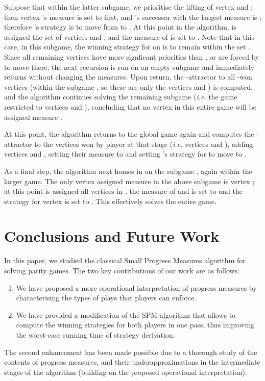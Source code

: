 \documentclass{eptcs}
\newcommand{\ie}{\emph{i.e.}\xspace}
\begin{document}
Suppose that within the latter subgame, we prioritise the lifting of
vertex  and ; then vertex 's measure is set to 
first, and 's successor with the largest measure is ;
therefore 's strategy is to move from  to . At this
point in the algorithm,  is assigned the set of vertices 
and , and the measure of  is set to . Note that in this
case, in this subgame, the winning strategy for  on  is to remain within
the set . Since all
remaining vertices have more signficant priorities than , or
are forced by  to move there, the next recursion is run on
an empty subgame and immediately returns without changing the
measures. Upon return, the -attractor to all -won
vertices (within the subgame , so these are only the 
vertices  and )
is computed, and the algorithm continues solving the remaining
subgame (\ie the game restricted to vertices  and ),
concluding that no vertex in this entire game will be assigned
measure .

At this point, the algorithm returns to the global game again and
computes the -attractor to the vertices won by player  at that stage
(\ie vertices  and ), adding vertices  and ,
setting their measure to  
and setting 's strategy for  to move to . 

As a final step, the algorithm next homes in on the subgame ,
again within the larger game.  The only vertex assigned measure
 in the above subgame is vertex ; at this point  is
assigned all vertices in , the measure of  and  is set to
 and the  strategy for vertex  is set to .
This effectively solves the entire game.



\section{Conclusions and Future Work}
In this paper, we studied the classical Small Progress Measures algorithm for solving
parity games.  The two key contributions of our work are as follows:
\begin{enumerate}
 \item We have proposed a more operational interpretation of progress measures by characterising the types of plays that players can enforce. 
 \item We have provided a modification of the SPM algorithm that allows to compute the winning strategies for both players in one pass, thus improving the worst-case running time of strategy derivation.
 \end{enumerate}
The second enhancement has been made possible due to a thorough study of the contents of progress measures, and their underapproximations in the intermediate stages of the algorithm (building on the proposed operational interpretation). \medskip
\end{document}

